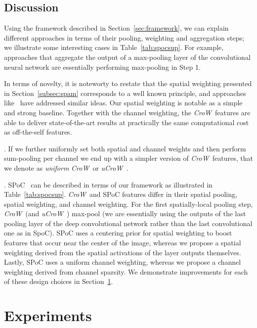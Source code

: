 \documentclass[runningheads]{llncs}
\newcommand{\CroW}{\textit{CroW}~} \newcommand{\Crow}{\CroW}
\newcommand{\uCrow}{\textit{uCroW}~}
\begin{document}
 



\subsection{Discussion}
\label{subsec:discussion}



\noindent


Using the framework described in Section~\ref{sec:framework}, we can explain different approaches in terms of their pooling, weighting and aggregation steps; we illustrate some interesting cases in Table~\ref{tab:spocsup}.
For example, approaches that aggregate the output of a max-pooling layer of the convolutional neural network are essentially performing max-pooling in Step 1.



In terms of novelty, it is noteworty to restate that the spatial weighting presented in Section~\ref{subsec:spam} corresponds to a well known principle, and approaches like~\cite{JeZi14, MuPe14, CiMV15} have addressed similar ideas. Our spatial weighting is notable as a simple and strong baseline. Together with the channel weighting, the \Crow features are able to deliver state-of-the-art results at practically the same computational cost as off-the-self features.
 
.
If we  further uniformly set both spatial and channel weights and then perform sum-pooling per channel we end up with a simpler version of \Crow features, that we denote as \textit{uniform }\CroW or \uCrow. 

.
SPoC~\cite{BaLe15} can be described in terms of our framework as illustrated in Table~\ref{tab:spocsup}.
\Crow and SPoC features differ in their spatial pooling, spatial weighting, and channel weighting. For the first spatially-local pooling step, \Crow (and \uCrow) max-pool (we are essentially using the outputs of the last pooling layer of the deep convolutional network rather than the last convolutional one as in SpoC). SPoC uses a centering prior for spatial weighting to boost features that occur near the center of the image, whereas we propose a spatial weighting derived from the spatial activations of the layer outputs themselves. Lastly, SPoC uses a uniform channel weighting, whereas we propose a channel weighting derived from channel sparsity. We demonstrate improvements for each of these design choices in Section~\ref{sec:exp}.

 \section{Experiments}
\label{sec:exp}
\end{document}
